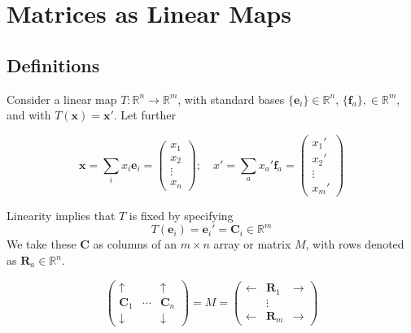 \documentclass{article}
\begin{document}
\section{Matrices as Linear Maps}
\subsection{Definitions}
Consider a linear map $T: \mathbb R^n \to \mathbb R^m$, with standard bases $\{ \bm e_i \} \in \mathbb R^n$, $\{ \bm f_a \}, \in \mathbb R^m$, and with $T(\bm x) = \bm x'$.
Let further

\[ \bm x = \sum_i x_i \bm e_i = \begin{pmatrix}
		x_1 \\ x_2 \\ \vdots \\ x_n
	\end{pmatrix};\quad x' = \sum_a x_a' \bm f_a = \begin{pmatrix}
		x_1' \\ x_2' \\ \vdots \\ x_m'
	\end{pmatrix} \]

Linearity implies that $T$ is fixed by specifying
\[ T(\bm e_i) = \bm e_i' = \bm C_i \in \mathbb R^m \]
We take these $\bm C$ as columns of an $m \times n$ array or matrix $M$, with rows denoted as $\bm R_a \in \mathbb R^n$.

\[ \begin{pmatrix}
		\uparrow   &        & \uparrow   \\
		\bm C_1    & \cdots & \bm C_n    \\
		\downarrow &        & \downarrow
	\end{pmatrix} = M = \begin{pmatrix}
		\leftarrow & \bm R_1 & \rightarrow \\
		           & \vdots  &             \\
		\leftarrow & \bm R_m & \rightarrow
	\end{pmatrix} \]
\end{document}
